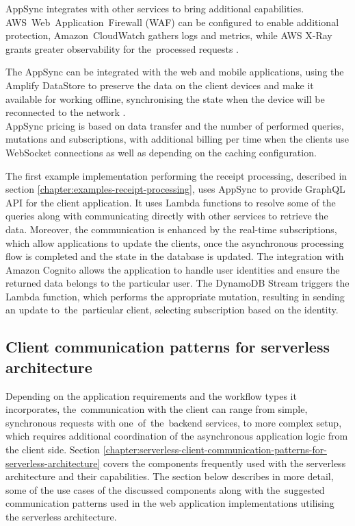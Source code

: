 AppSync integrates with other services to bring additional capabilities.
AWS~Web~Application~Firewall (WAF) can be configured to enable additional protection, Amazon~CloudWatch gathers logs and metrics, while AWS X-Ray grants greater observability for the~processed requests \cite{DevelopServerlessGraphQLArchitecturesUsingAWSAppSync}.

The AppSync can be integrated with the web and mobile applications, using the Amplify DataStore to preserve the data on the client devices and make it available for working offline, synchronising the state when the device will be reconnected to the network \cite{AppSyncFeatures}. \\

AppSync pricing is based on data transfer and the number of performed queries, mutations and subscriptions, with additional billing per time when the clients use WebSocket connections as well as depending on the caching configuration.

The first example implementation performing the receipt processing, described in section \ref{chapter:examples-receipt-processing}, uses AppSync to provide GraphQL API for the client application. It uses Lambda functions to resolve some of the queries along with communicating directly with other services to retrieve the data.
Moreover, the communication is enhanced by the real-time subscriptions, which allow applications to update the clients, once the asynchronous processing flow is completed and the state in the database is updated.
The integration with Amazon Cognito allows the application to handle user identities and ensure the returned data belongs to the particular user.
The DynamoDB Stream triggers the Lambda function, which performs the appropriate mutation, resulting in sending an update to~the~particular client, selecting subscription based on the identity.

\subsection{Client communication patterns for serverless architecture} \label{chapter:client-communication-patterns-for-serverless-architecture}

Depending on the application requirements and the workflow types it incorporates, the~communication with the client can range from simple, synchronous requests with one~of~the~backend services, to more complex setup, which requires additional coordination of the asynchronous application logic from the client side.
Section \ref{chapter:serverless-client-communication-patterns-for-serverless-architecture} covers the components frequently used with the serverless architecture and their capabilities.
The section below describes in more detail, some of the use cases of the discussed components along with the~suggested communication patterns used in the web application implementations utilising the serverless architecture.

